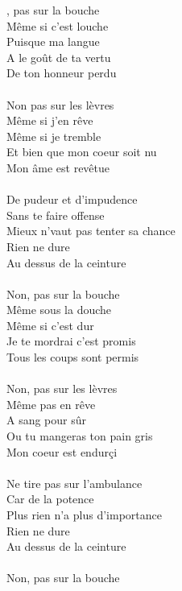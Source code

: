 

, pas sur la bouche
\\Même si c'est louche
\\Puisque ma langue
\\A le goût de ta vertu
\\De ton honneur perdu
\\\\Non pas sur les lèvres
\\Même si j'en rêve
\\Même si je tremble
\\Et bien que mon coeur soit nu
\\Mon âme est revêtue
\\\\De pudeur et d'impudence
\\Sans te faire offense
\\Mieux n'vaut pas tenter sa chance
\\Rien ne dure
\\Au dessus de la ceinture
\\\\Non, pas sur la bouche
\\Même sous la douche
\\Même si c'est dur
\\Je te mordrai c'est promis
\\Tous les coups sont permis
\\\\Non, pas sur les lèvres
\\Même pas en rêve
\\A sang pour sûr
\\Ou tu mangeras ton pain gris
\\Mon coeur est endurçi
\\\\Ne tire pas sur l'ambulance
\\Car de la potence
\\Plus rien n'a plus d'importance
\\Rien ne dure
\\Au dessus de la ceinture
\\\\Non, pas sur la bouche
